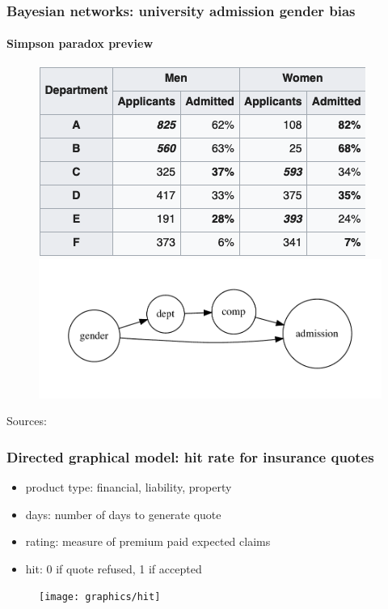 \begin{frame}
  \frametitle{Bayesian networks: university admission gender bias}
  \framesubtitle{Simpson paradox preview}

  \begin{figure}[ht]
    \centering
            \includegraphics[height=0.35\textheight]{graphics/berkeley_later} 
            \includegraphics[height=0.35\textheight]{graphics/admission_later}
    \end{figure}
    Sources: \cite{simpson-wikipedia} \cite{Bickel398}
\end{frame}


\begin{frame}
\frametitle{Directed graphical model: hit rate for insurance quotes}
\begin{itemize}
  \item product type: financial, liability, property
  \item days: number of days to generate quote
  \item rating: measure of premium paid expected claims
  \item hit: 0 if quote refused, 1 if accepted
\end{itemize}
\begin{figure}[ht]
  \centering
  \texttt{[image: graphics/hit]}
\end{figure}
\end{frame}


